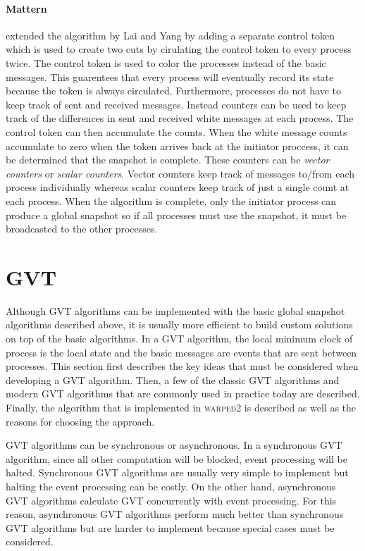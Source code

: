 \documentclass[11pt]{book}
\begin{document}
\paragraph{Mattern} \cite{mattern-93} extended the algorithm by Lai and Yang by adding a separate
control token which is used to create two cuts by cirulating the control token to every process
twice.  The control token is used to color the processes instead of the basic messages.  This
guarentees that every process will eventually record its state because the token is always
circulated.  Furthermore, processes do not have to keep track of sent and received messages.
Instead counters can be used to keep track of the differences in sent and received white messages at
each process.  The control token can then accumulate the counts.  When the white message counts
accumulate to zero when the token arrives back at the initiator proccess, it can be determined that
the snapshot is complete.  These counters can be \emph{vector counters} or \emph{scalar counters}.
Vector counters keep track of messages to/from each process individually whereas scalar counters
keep track of just a single count at each process.  When the algorithm is complete, only the
initiator process can produce a global snapshot so if all processes must use the snapshot, it must
be broadcasted to the other processes.

\section{GVT}

Although GVT algorithms can be implemented with the basic global snapshot algorithms described
above, it is usually more efficient to build custom solutions on top of the basic algorithms.  In a
GVT algorithm, the local minimum clock of process is the local state and the basic messages are
events that are sent between processes.  This section first describes the key ideas that must be
considered when developing a GVT algorithm.  Then, a few of the classic GVT algorithms and modern
GVT algorithms that are commonly used in practice today are described.  Finally, the algorithm that
is implemented in \textsc{warped2} is described as well as the reasons for choosing the approach.

GVT algorithms can be synchronous or asynchronous.  In a synchronous GVT algorithm, since all other
computation will be blocked, event processing will be halted.  Synchronous GVT algorithms are
usually very simple to implement but halting the event processing can be costly.  On the other hand,
asynchronous GVT algorithms calculate GVT concurrently with event processing.  For this reason,
asynchronous GVT algorithms perform much better than synchronous GVT algorithms but are harder to
implement because special cases must be considered.
\end{document}
